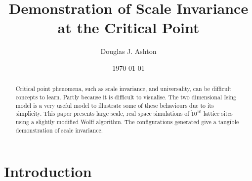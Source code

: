 \documentclass[aps,prl,reprint,groupedaddress, showpacs]{revtex4-1}
\begin{document}

\title{Demonstration of Scale Invariance at the Critical Point}

\author{Douglas J. Ashton}


\date{\today}

\begin{abstract}
Critical point phenomena, such as scale invariance, and universality, can be difficult concepts to learn. Partly because it is difficult to visualise. The two dimensional Ising model is a very useful model to illustrate some of these behaviours due to its simplicity. This paper presents large scale, real space simulations of $ \tilde 10^10 $ lattice sites using a slightly modified Wolff algorithm. The configurations generated give a tangible demonstration of scale invariance.
\end{abstract}


\maketitle

\section{Introduction}{\label{sec-intro}}
\end{document}
